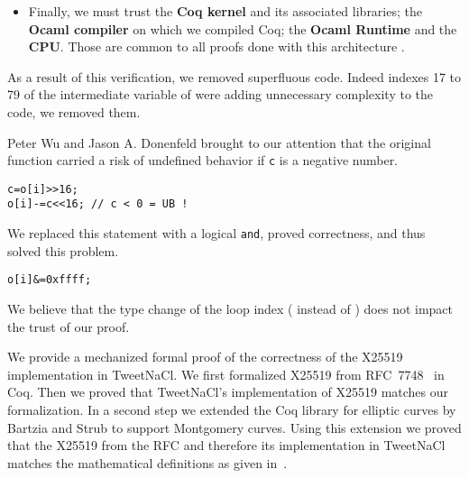 \begin{itemize}
  \item Finally,
  we must trust the \textbf{Coq kernel} and its
  associated libraries; the \textbf{Ocaml compiler} on which we compiled Coq;
  the \textbf{Ocaml Runtime} and the \textbf{CPU}. Those are common to all proofs
  done with this architecture \cite{2015-Appel,coq-faq}.
\end{itemize}

As a result of this verification, we removed superfluous code.
Indeed indexes 17 to 79 of the  intermediate variable of
 were adding unnecessary complexity to the code,
we removed them.

Peter Wu and Jason A. Donenfeld brought to our attention that the original
 function carried a risk of undefined behavior if \texttt{c}
is a negative number.
\begin{lstlisting}[language=Ctweetnacl]
c=o[i]>>16;
o[i]-=c<<16; // c < 0 = UB !
\end{lstlisting}
We replaced this statement with a logical \texttt{and}, proved correctness,
and thus solved this problem.
\begin{lstlisting}[language=Ctweetnacl]
o[i]&=0xffff;
\end{lstlisting}

We believe that the type change of the loop index ( instead of )
does not impact the trust of our proof.

We provide a mechanized formal proof of the correctness of the X25519
implementation in TweetNaCl.
We first formalized X25519 from RFC~7748~\cite{rfc7748} in Coq. Then we proved
that TweetNaCl's implementation of X25519 matches our formalization.
In a second step we extended the Coq library for elliptic curves \cite{BartziaS14}
by Bartzia and Strub to support Montgomery curves. Using this extension we
proved that the X25519 from the RFC and therefore its implementation in TweetNaCl matches
the mathematical definitions as given in~\cite[Sec.~2]{Ber06}.
